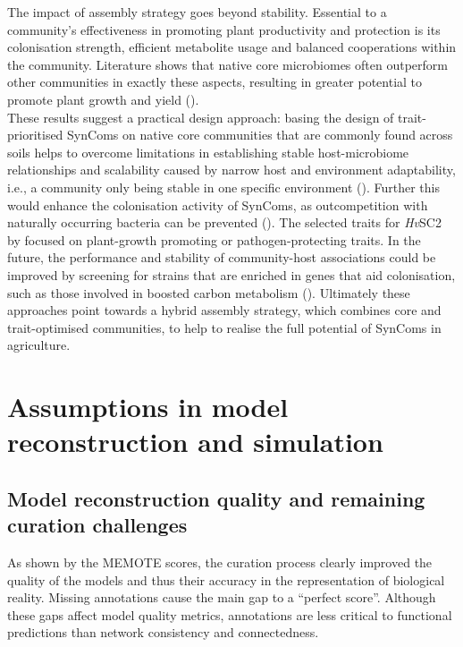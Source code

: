 The impact of assembly strategy goes beyond stability. Essential to a community’s effectiveness in promoting plant productivity and protection is its colonisation strength, efficient metabolite usage and balanced cooperations within the community. Literature shows that native core microbiomes often outperform other communities in exactly these aspects, resulting in greater potential to promote plant growth and yield (\cite{de_souza_microbiome_2020, zhou_superiority_2024}). 
\\


These results suggest a practical design approach: basing the design of trait-prioritised SynComs on native core communities that are commonly found across soils helps to overcome limitations in establishing stable host-microbiome relationships and scalability caused by narrow host and environment adaptability, i.e., a community only being stable in one specific environment (\cite{zhou_superiority_2024}). Further this would enhance the colonisation activity of SynComs, as outcompetition with naturally occurring bacteria can be prevented (\cite{de_souza_microbiome_2020}). The selected traits for \textit{Hv}SC2 by \cite{mahdi_low_2026} focused on plant-growth promoting or pathogen-protecting traits. In the future, the performance and stability of community-host associations could be improved by screening for strains that are enriched in genes that aid colonisation, such as those involved in boosted carbon metabolism (\cite{de_souza_genome_2019}). Ultimately these approaches point towards a hybrid assembly strategy, which combines core and trait-optimised communities, to help to realise the full potential of SynComs in agriculture. 

\section{Assumptions in model reconstruction and simulation}

\subsection{Model reconstruction quality and remaining curation challenges}
As shown by the MEMOTE scores, the curation process clearly improved the quality of the models and thus their accuracy in the representation of biological reality. Missing annotations cause the main gap to a “perfect score”. Although these gaps affect model quality metrics, annotations are less critical to functional predictions than network consistency and connectedness. 
\\


